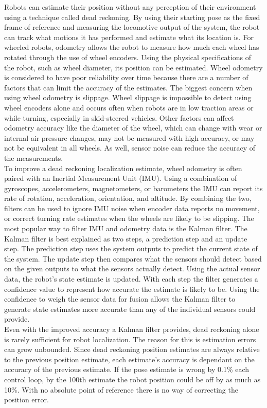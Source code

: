 Robots can estimate their position without any perception of their environment using a technique called dead reckoning. By using their starting pose as the fixed frame of reference and measuring the locomotive output of the system, the robot can track what motions it has performed and estimate what its location is. For wheeled robots, odometry allows the robot to measure how much each wheel has rotated through the use of wheel encoders. Using the physical specifications of the robot, such as wheel diameter, its position can be estimated. Wheel odometry is considered to have poor reliability over time because there are a number of factors that can limit the accuracy of the estimates. The biggest concern when using wheel odometry is slippage. Wheel slippage is impossible to detect using wheel encoders alone and occurs often when robots are in low traction areas or while turning, especially in skid-steered vehicles. Other factors can affect odometry accuracy like the diameter of the wheel, which can change with wear or internal air pressure changes, may not be measured with high accuracy, or may not be equivalent in all wheels. As well, sensor noise can reduce the accuracy of the measurements.\\

To improve a dead reckoning localization estimate, wheel odometry is often paired with an Inertial Measurement Unit (IMU). Using a combination of gyroscopes, accelerometers, magnetometers, or barometers the IMU can report its rate of rotation, acceleration, orientation, and altitude. By combining the two, filters can be used to ignore IMU noise when encoder data reports no movement, or correct turning rate estimates when the wheels are likely to be slipping. The most popular way to filter IMU and odometry data is the Kalman filter. The Kalman filter is best explained as two steps, a prediction step and an update step. The prediction step uses the system outputs to predict the current state of the system. The update step then compares what the sensors should detect based on the given outputs to what the sensors actually detect. Using the actual sensor data, the robot's state estimate is updated. With each step the filter generates a confidence value to represent how accurate the estimate is likely to be. Using the confidence to weigh the sensor data for fusion allows the Kalman filter to generate state estimates more accurate than any of the individual sensors could provide.\\

Even with the improved accuracy a Kalman filter provides, dead reckoning alone is rarely sufficient for robot localization. The reason for this is estimation errors can grow unbounded. Since dead reckoning position estimates are always relative to the previous position estimate, each estimate's accuracy is dependant on the accuracy of the previous estimate. If the pose estimate is wrong by 0.1\% each control loop, by the 100th estimate the robot position could be off by as much as 10\%. With no absolute point of reference there is no way of correcting the position error.\\

